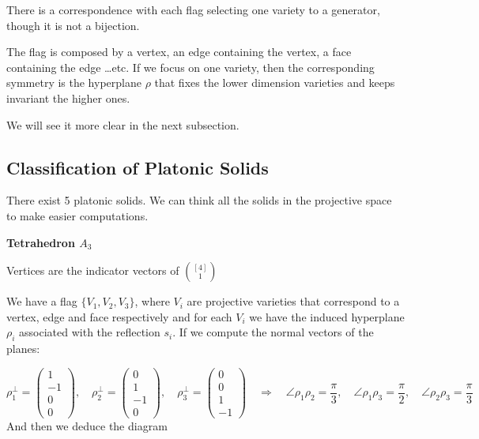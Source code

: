 \documentclass{myclass}
\begin{document}
There is a correspondence with each flag selecting one variety to a generator, though it is not a bijection.

The flag is composed by a vertex, an edge containing the vertex, a face containing the edge \ldots etc. If we focus on one variety, then the corresponding symmetry is the hyperplane $\rho $ that fixes the lower dimension varieties and keeps invariant the higher ones.

We will see it more clear in the next subsection.

\subsection{Classification of Platonic Solids}
There exist 5 platonic solids. We can think all the solids in the projective space to make easier computations.

\textbf{Tetrahedron $A_3$}

Vertices are the indicator vectors of $\binom{[4]}{1}$

We have a flag $\{V_1, V_2, V_3\}$, where $V_i$ are projective varieties that correspond to a vertex, edge and face respectively and for each  $V_i$ we have the induced hyperplane $\rho_i $ associated with the reflection $s_i$. If we compute the normal vectors of the planes:

 \[
\rho_1^\perp = \begin{pmatrix} 1\\-1\\0\\0 \end{pmatrix} , \quad
\rho_2^\perp = \begin{pmatrix} 0\\1\\-1\\0 \end{pmatrix} , \quad
\rho_3^\perp = \begin{pmatrix} 0\\0\\1\\-1 \end{pmatrix} \quad
\Rightarrow \quad
\angle \rho_1 \rho _2 = \frac{\pi}{3}, \quad
\angle \rho_1 \rho _3 = \frac{\pi}{2}, \quad
\angle \rho_2 \rho _3 = \frac{\pi}{3}
\] 
And then we deduce the diagram
\end{document}
